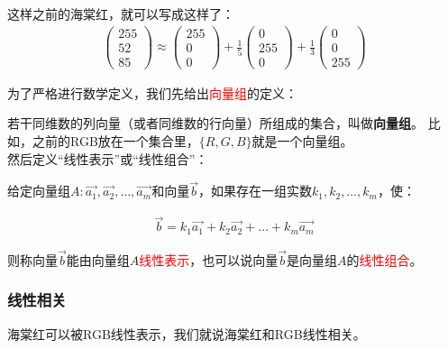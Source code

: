 \documentclass[UTF8]{ctexbook}
\begin{document}
这样之前的海棠红，就可以写成这样了：\\

\begin{equation}
\begin{aligned}
\begin{pmatrix} 255 \\ 52 \\ 85 \end{pmatrix} \approx
\begin{pmatrix} 255 \\ 0 \\ 0 \end{pmatrix} +
\frac{1}{5}\begin{pmatrix} 0 \\ 255 \\ 0 \end{pmatrix} +
\frac{1}{3}\begin{pmatrix} 0 \\ 0 \\ 255 \end{pmatrix}
\end{aligned}
\end{equation}

为了严格进行数学定义，我们先给出\textcolor{red}{向量组}的定义：

若干同维数的列向量（或者同维数的行向量）所组成的集合，叫做\textbf{向量组}。 比如，之前的RGB放在一个集合里，$\{R,G,B\}$就是一个向量组。\\

然后定义“线性表示”或“线性组合”：

给定向量组$A: \vec{a_{1}},\vec{a_{2}},\dots,\vec{a_{m}}$和向量$\vec{b}$，如果存在一组实数$k_{1},k_{2},\dots,k_{m}$，使：

\begin{equation}
\begin{aligned}
\vec{b}=k_{1}\vec{a_{1}}+k_{2}\vec{a_{2}}+\dots+k_{m}\vec{a_{m}}
\end{aligned}
\end{equation}

则称向量$\vec{b}$能由向量组$A$\textcolor{red}{线性表示}，也可以说向量$\vec{b}$是向量组$A$的\textcolor{red}{线性组合}。

\subsubsection{线性相关}

海棠红可以被RGB线性表示，我们就说海棠红和RGB线性相关。
\end{document}
